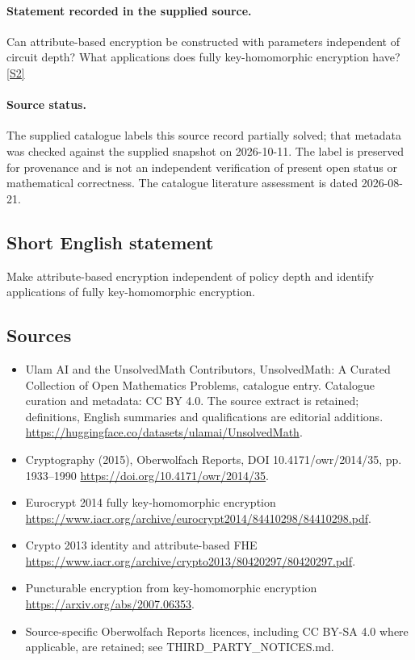 \documentclass[11pt]{article}
\begin{document}
\paragraph{Statement recorded in the supplied source.}
Can attribute-based encryption be constructed with parameters independent of circuit depth? What applications does fully key-homomorphic encryption have? \href{https://doi.org/10.4171/owr/2014/35}{[S2]}
\paragraph{Source status.}
The supplied catalogue labels this source record partially solved; that metadata was checked against the supplied snapshot on 2026-10-11. The label is preserved for provenance and is not an independent verification of present open status or mathematical correctness. The catalogue literature assessment is dated 2026-08-21.
\subsection{Short English statement}
Make attribute-based encryption independent of policy depth and identify applications of fully key-homomorphic encryption.
\subsection{Sources}
\begin{itemize}
\item[S1] Ulam AI and the UnsolvedMath Contributors, UnsolvedMath: A Curated Collection of Open Mathematics Problems, catalogue entry. Catalogue curation and metadata: CC BY 4.0. The source extract is retained; definitions, English summaries and qualifications are editorial additions.
\url{https://huggingface.co/datasets/ulamai/UnsolvedMath}.
\item[S2] Cryptography (2015), Oberwolfach Reports, DOI 10.4171/owr/2014/35, pp. 1933--1990
\url{https://doi.org/10.4171/owr/2014/35}.
\item[S3] Eurocrypt 2014 fully key-homomorphic encryption
\url{https://www.iacr.org/archive/eurocrypt2014/84410298/84410298.pdf}.
\item[S4] Crypto 2013 identity and attribute-based FHE
\url{https://www.iacr.org/archive/crypto2013/80420297/80420297.pdf}.
\item[S5] Puncturable encryption from key-homomorphic encryption
\url{https://arxiv.org/abs/2007.06353}.
\item Source-specific Oberwolfach Reports licences, including CC BY-SA 4.0 where applicable, are retained; see THIRD\_PARTY\_NOTICES.md.
\end{itemize}
\end{document}
